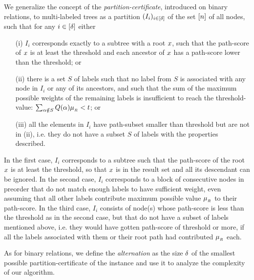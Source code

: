 We generalize the concept of the {\em partition-certificate}, introduced on binary
relations, to multi-labeled trees as a partition $(I_i)_{i\in[\delta]}$ of the set $[n]$ of all
nodes, such that for any $i\in[\delta]$ either
%
\begin{itemize}

\item[(i)] $I_i$ corresponds exactly to a subtree with a root $x$, such
  that the path-score of $x$ is at least the threshold and each
  ancestor of $x$ has a path-score lower than the threshold; or

\item[(ii)] there is a set $S$ of labels such that no label from $S$ is
  associated with any node in $I_i$ or any of its ancestors,
  and such that the sum of the maximum possible weights of the remaining labels is
  insufficient to reach the threshold-value:  $\sum_{\alpha\notin S}Q(\alpha)\mu_{_{R}}<t$; or

\item[(iii)] all the elements in $I_i$ have path-subset smaller than threshold but are not in (ii),
  i.e. they do not have a subset $S$ of labels with the properties described.

\end{itemize}
%
In the first case, $I_i$ corresponds to a subtree such that the
path-score of the root $x$ is at least the threshold, so that
$x$ is in the result set and all its descendant can be ignored.
%
In the second case, $I_i$ corresponds to a block of consecutive nodes
in preorder that do not match enough labels to have sufficient weight, even assuming that all other labels contribute maximum possible value $\mu_{_{R}}$ to their path-score.
%
In the third case, $I_i$ consists of node(s) whose path-score is less than the threshold as in the second case, but that do not have a subset of labels mentioned above, i.e. they would have gotten path-score of threshold or more, if all the labels associated with them or their root path had contributed $\mu_{_{R}}$ each.

As for binary relations, we define the {\em alternation} as the size
$\delta$ of the smallest possible partition-certificate of the
instance and use it to analyze the complexity of our algorithm.

